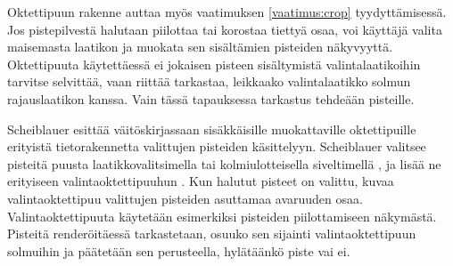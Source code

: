 

Oktettipuun rakenne auttaa myös vaatimuksen \ref{vaatimus:crop} tyydyttämisessä. Jos pistepilvestä halutaan piilottaa tai korostaa tiettyä osaa, voi käyttäjä valita maisemasta laatikon ja muokata sen sisältämien pisteiden näkyvyyttä. Oktettipuuta käytettäessä ei jokaisen pisteen sisältymistä valintalaatikoihin tarvitse selvittää, vaan riittää tarkastaa, leikkaako valintalaatikko solmun rajauslaatikon kanssa. Vain tässä tapauksessa tarkastus tehdeään pisteille.

Scheiblauer esittää väitöskirjassaan sisäkkäisille muokattaville oktettipuille erityistä tietorakennetta valittujen pisteiden käsittelyyn. Scheiblauer valitsee pisteitä puusta laatikkovalitsimella tai kolmiulotteisella siveltimellä , ja lisää ne erityiseen valintaoktettipuuhun . Kun halutut pisteet on valittu, kuvaa valintaoktettipuu valittujen pisteiden asuttamaa avaruuden osaa. Valintaoktettipuuta käytetään esimerkiksi pisteiden piilottamiseen näkymästä. Pisteitä renderöitäessä tarkastetaan, osuuko sen sijainti valintaoktettipuun solmuihin ja päätetään sen perusteella, hylätäänkö piste vai ei. \cite{scheiblauer}
